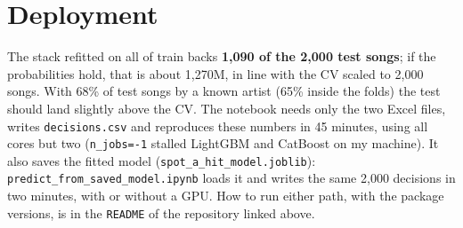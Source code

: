 \documentclass[10pt,a4paper,twocolumn]{extarticle}
\begin{document}
\section{Deployment}
The stack refitted on all of train backs \textbf{1{,}090 of the 2{,}000 test songs}; if the
probabilities hold, that is about 1{,}270M, in line with the CV scaled to 2{,}000 songs. With
68\% of test songs by a known artist (65\% inside the folds) the test should land slightly
above the CV. The notebook needs only the two Excel files, writes \texttt{decisions.csv} and
reproduces these numbers in 45 minutes, using all cores but two (\texttt{n\_jobs=-1}
stalled LightGBM and CatBoost on my machine). It also saves the fitted model
(\texttt{spot\_a\_hit\_model.joblib}): \texttt{predict\_from\_saved\_model.ipynb} loads it and
writes the same 2{,}000 decisions in two minutes, with or without a GPU. How to run either path, with the package versions, is in the \texttt{README} of the repository linked above.
\end{document}
